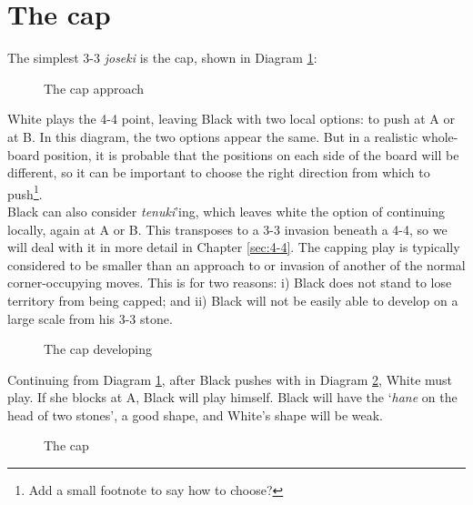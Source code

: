 \documentclass[a5paper,12pt,twoside]{book} %
\newcounter{joseki}                 %
\newcommand{\dref}[1]{Diagram \ref{#1}}
\begin{document}
\section{The cap}
The simplest 3-3 \textit{joseki} is the cap, shown in \dref{the-cap:1}:

\begin{figure}[!htbp]
 
\vspace{-0.6cm}\caption{The cap approach}
\label{the-cap:1}
\end{figure}

White plays the 4-4 point, leaving Black with two local options: to push at A or at B. In this diagram, the two options appear the same. But in a realistic whole-board position, it is probable that the positions on each side of the board will be different, so it can be important to choose the right direction from which to push\footnote{Add a small footnote to say how to choose?}.\\

Black can also consider \textit{tenuki}'ing, which leaves white the option of continuing locally, again at A or B. This transposes to a 3-3 invasion beneath a 4-4, so we will deal with it in more detail in Chapter \ref{sec:4-4}. The capping play{\large\whitestone[1]} is typically considered to be smaller than an approach to or invasion of another of the normal corner-occupying moves. This is for two reasons: i) Black does not stand to lose territory from being capped; and ii) Black will not be easily able to develop on a large scale from his 3-3 stone.\\

\begin{figure}[!htbp]
 
\vspace{-0.6cm}\caption{The cap developing}
\label{3-3:2}
\end{figure}

Continuing from \dref{the-cap:1}, after Black pushes with{\large\blackstone[2]} in \dref{3-3:2}, White must play{\large\whitestone[3]}. If she blocks at A, Black will play{\large\blackstone[3]} himself. Black will have the `\textit{hane} on the head of two stones', a good shape, and White's shape will be weak.\\

\begin{figure}[!htbp]

\vspace{-0.6cm}\caption{The cap}
\label{3-3:the-cap}
\end{figure}
\end{document}
